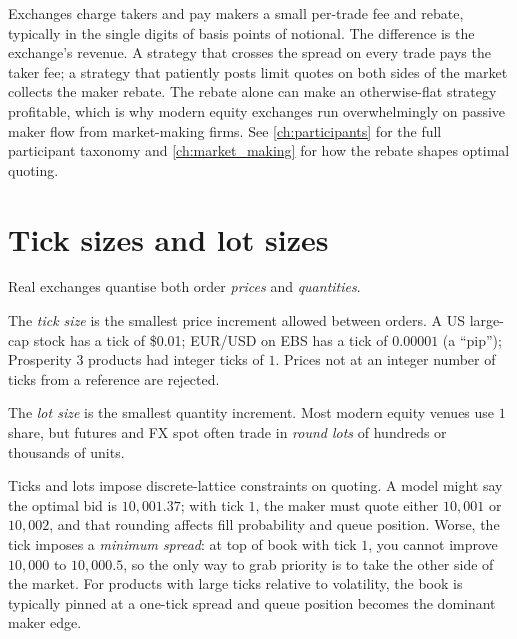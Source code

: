 \begin{keyfactbox}
Exchanges charge takers and pay makers a small per-trade fee and
rebate, typically in the single digits of basis points of notional.
The difference is the exchange's revenue. A strategy that crosses
the spread on every trade pays the taker fee; a strategy that
patiently posts limit quotes on both sides of the market collects
the maker rebate. The rebate alone can make an otherwise-flat
strategy profitable, which is why modern equity exchanges run
overwhelmingly on passive maker flow from market-making firms. See
\cref{ch:participants} for the full participant taxonomy and
\cref{ch:market_making} for how the rebate shapes optimal quoting.
\end{keyfactbox}

\section{Tick sizes and lot sizes}
\label{sec:tick_lot}

Real exchanges quantise both order \emph{prices} and
\emph{quantities}.

\begin{definition}
The \emph{tick size} is the smallest price increment allowed between
orders. A US large-cap stock has a tick of \$0.01; EUR/USD on EBS has
a tick of $0.00001$ (a ``pip''); Prosperity 3 products had integer
ticks of $1$. Prices not at an integer number of ticks from a
reference are rejected.
\end{definition}

\begin{definition}
The \emph{lot size} is the smallest quantity increment. Most modern
equity venues use $1$ share, but futures and FX spot often trade in
\emph{round lots} of hundreds or thousands of units.
\end{definition}

Ticks and lots impose discrete-lattice constraints on quoting. A
model might say the optimal bid is $10{,}001.37$; with tick $1$, the
maker must quote either $10{,}001$ or $10{,}002$, and that rounding
affects fill probability and queue position. Worse, the tick imposes
a \emph{minimum spread}: at top of book with tick $1$, you cannot
improve $10{,}000$ to $10{,}000.5$, so the only way to grab priority
is to take the other side of the market. For products with large
ticks relative to volatility, the book is typically pinned at a
one-tick spread and queue position becomes the dominant maker edge.

